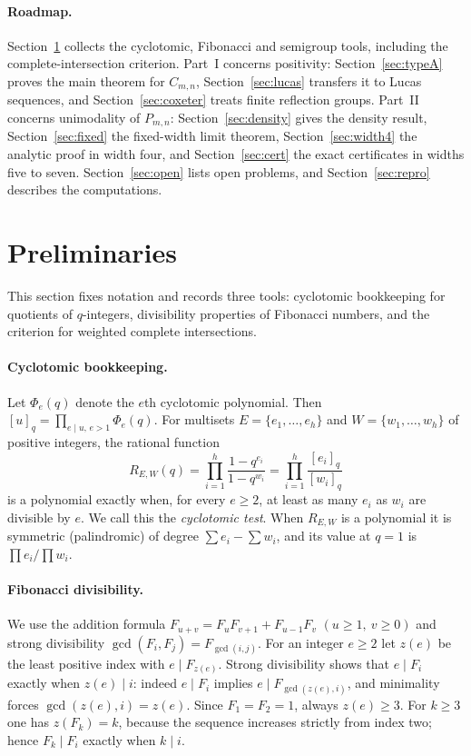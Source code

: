 \documentclass[11pt,a4paper]{article}
\theoremstyle{definition}\newtheorem{definition}[theorem]{Definition}
\theoremstyle{remark}\newtheorem{remark}[theorem]{Remark}\newtheorem{example}[theorem]{Example}
\numberwithin{equation}{section}
\begin{document}
\paragraph{Roadmap.}
Section~\ref{sec:prelim} collects the cyclotomic, Fibonacci and semigroup tools, including the complete-intersection criterion. Part~I concerns positivity: Section~\ref{sec:typeA} proves the main theorem for $C_{m,n}$, Section~\ref{sec:lucas} transfers it to Lucas sequences, and Section~\ref{sec:coxeter} treats finite reflection groups. Part~II concerns unimodality of $P_{m,n}$: Section~\ref{sec:density} gives the density result, Section~\ref{sec:fixed} the fixed-width limit theorem, Section~\ref{sec:width4} the analytic proof in width four, and Section~\ref{sec:cert} the exact certificates in widths five to seven. Section~\ref{sec:open} lists open problems, and Section~\ref{sec:repro} describes the computations.

\section{Preliminaries}\label{sec:prelim}
This section fixes notation and records three tools: cyclotomic bookkeeping for quotients of $q$-integers, divisibility properties of Fibonacci numbers, and the criterion for weighted complete intersections.

\paragraph{Cyclotomic bookkeeping.}
Let $\Phi_e(q)$ denote the $e$th cyclotomic polynomial. Then $[u]_q=\prod_{e\mid u,\,e>1}\Phi_e(q)$. For multisets $E=\{e_1,\ldots,e_h\}$ and $W=\{w_1,\ldots,w_h\}$ of positive integers, the rational function
\begin{equation}\label{eq:quotient}
 R_{E,W}(q)=\prod_{i=1}^h\frac{1-q^{e_i}}{1-q^{w_i}}=\prod_{i=1}^h\frac{[e_i]_q}{[w_i]_q}
\end{equation}
is a polynomial exactly when, for every $e\ge2$, at least as many $e_i$ as $w_i$ are divisible by $e$. We call this the \emph{cyclotomic test}. When $R_{E,W}$ is a polynomial it is symmetric (palindromic) of degree $\sum e_i-\sum w_i$, and its value at $q=1$ is $\prod e_i/\prod w_i$.

\paragraph{Fibonacci divisibility.}
We use the addition formula $F_{u+v}=F_uF_{v+1}+F_{u-1}F_v$ $(u\ge1,\ v\ge0)$ and strong divisibility $\gcd(F_i,F_j)=F_{\gcd(i,j)}$. For an integer $e\ge2$ let $z(e)$ be the least positive index with $e\mid F_{z(e)}$. Strong divisibility shows that $e\mid F_i$ exactly when $z(e)\mid i$: indeed $e\mid F_i$ implies $e\mid F_{\gcd(z(e),i)}$, and minimality forces $\gcd(z(e),i)=z(e)$. Since $F_1=F_2=1$, always $z(e)\ge3$. For $k\ge3$ one has $z(F_k)=k$, because the sequence increases strictly from index two; hence $F_k\mid F_i$ exactly when $k\mid i$.
\end{document}
